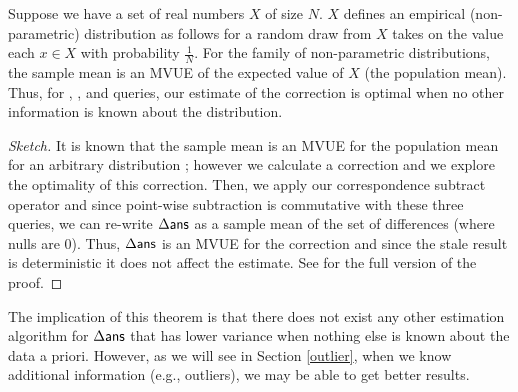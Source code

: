 \begin{theorem}
Suppose we have a set of real numbers $X$ of size $N$. 
$X$ defines an empirical (non-parametric) distribution as follows for a random draw from $X$ takes on the value each $x \in X$ with probability $\frac{1}{N}$.
For the family of non-parametric distributions, the sample mean is an MVUE of the expected value of $X$ (the population mean).
Thus, for \sumfunc, \countfunc, and \avgfunc queries, our estimate of the correction is optimal when no other information is known about the distribution. 
\end{theorem}

\begin{proof}[Sketch]
It is known that the sample mean is an MVUE for the population mean for an arbitrary distribution \cite{shuster1982nonparametric}; however we calculate a correction and we explore the optimality of this correction.
Then, we apply our correspondence subtract operator and since point-wise subtraction is commutative with these three queries,
we can re-write $\Delta\textsf{ans}$ as a sample mean of the set of differences (where nulls are 0).
Thus, $\Delta\textsf{ans}$ is an MVUE for the correction and since the stale result is deterministic it does not affect the estimate.
See \cite{technicalReport} for the full version of the proof.
\end{proof}
The implication of this theorem is that there does not exist any other estimation algorithm for $\Delta\textsf{ans}$ that has lower variance when nothing else is known about the data a priori.
However, as we will see in Section \ref{outlier}, when we know additional information (e.g., outliers), we may be able to get better results.

